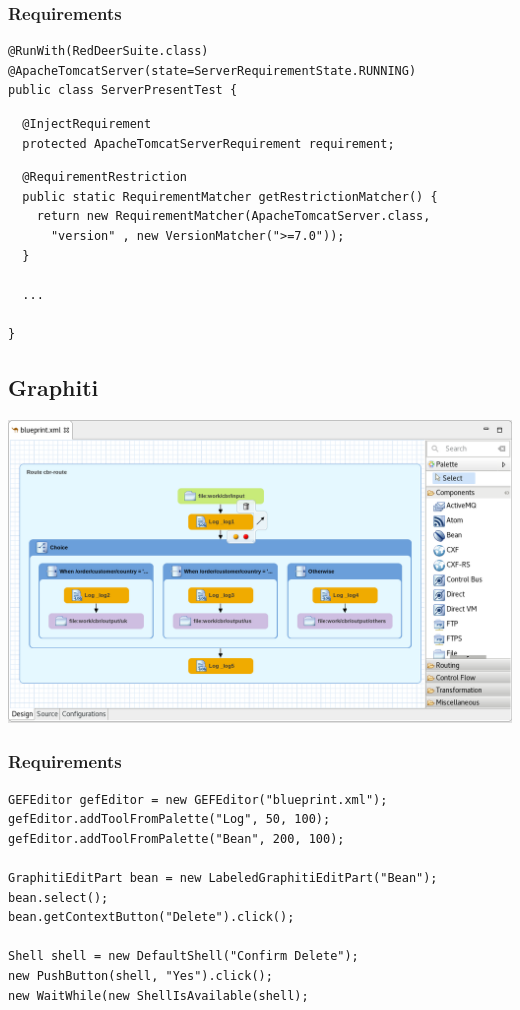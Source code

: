 \documentclass{beamer}
\begin{document}
\begin{frame}[fragile]
\frametitle{Requirements}
\begin{lstlisting}
@RunWith(RedDeerSuite.class)
@ApacheTomcatServer(state=ServerRequirementState.RUNNING)
public class ServerPresentTest {
\end{lstlisting}
\pause
\begin{lstlisting}
  @InjectRequirement
  protected ApacheTomcatServerRequirement requirement;
\end{lstlisting}
\pause
\begin{lstlisting}
  @RequirementRestriction
  public static RequirementMatcher getRestrictionMatcher() {
    return new RequirementMatcher(ApacheTomcatServer.class, 
      "version" , new VersionMatcher(">=7.0"));
  }

  ...

}
\end{lstlisting}
\end{frame}

\subsection{Graphiti}
\begin{frame}[fragile]
\begin{center}
\includegraphics[width=\textwidth,height=0.8\textheight,keepaspectratio]{fuse_tooling.png}
\end{center}
\end{frame}

\begin{frame}[fragile]
\frametitle{Requirements}
\begin{lstlisting}
GEFEditor gefEditor = new GEFEditor("blueprint.xml");
gefEditor.addToolFromPalette("Log", 50, 100);
gefEditor.addToolFromPalette("Bean", 200, 100);

GraphitiEditPart bean = new LabeledGraphitiEditPart("Bean");
bean.select();
bean.getContextButton("Delete").click();

Shell shell = new DefaultShell("Confirm Delete");
new PushButton(shell, "Yes").click();
new WaitWhile(new ShellIsAvailable(shell);
\end{lstlisting}
\end{frame}
\end{document}
